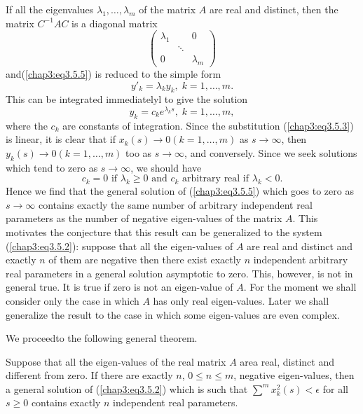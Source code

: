 If all the eigenvalues $\lambda_1, \ldots, \lambda_m$ of the matrix
$A$ are real and distinct, then the matrix $C^{-1} A C $ is a diagonal
matrix  
$$
\begin{pmatrix}
\lambda_1  & & 0\\
& \ddots & \\
0 & & \lambda_m
\end{pmatrix}
$$
and\pageoriginale (\ref{chap3:eq3.5.5}) is reduced to the simple form
\begin{equation*}
y'_k = \lambda_k y_k, \; k = 1, \ldots, m. \tag{3.5.6}\label{chap3:eq3.5.6}
\end{equation*}
This can be integrated immediatelyl to give the solution
\begin{equation*}
y_k = c_k e^{\lambda_k s}, \; k = 1, \ldots, m, \tag{3.5.7}\label{chap3:eq3.5.7}
\end{equation*}
where the $c_k$ are constants of integration. Since the substitution
(\ref{chap3:eq3.5.3}) is linear, it is clear that if $x_k (s) \to 0 (k
= 1, \ldots, m)$ as $s \to \infty$, then $y_k(s) \to 0 (k = 1, \ldots,
m)$ too as $s \to \infty$, and conversely. Since we seek solutions
which tend to zero as $s \to \infty$, we should have 
\begin{equation*}
c_k = 0 \text{ if } \lambda_k \geq 0 \text{ and } c_k \text{ arbitrary
  real if } \lambda_k < 0. \tag{3.5.8}\label{chap3:eq3.5.8} 
\end{equation*}
Hence we find that the general solution of (\ref{chap3:eq3.5.5}) which
goes to zero as $s \to \infty$ contains exactly the same number of
arbitrary independent real parameters as the number of negative
eigen-values of the matrix $A$. This motivates the conjecture that
this result can be generalized to the system (\ref{chap3:eq3.5.2}):
suppose that all the eigen-values of $A$ are real and distinct and
exactly $n$ of them are negative then there exist exactly $n$
independent arbitrary  real parameters in a general solution
asymptotic to zero. This, however, is not in general true. It is true
if zero is not an eigen-value of $A$. For the moment we shall consider
only the case in which $A$ has only real eigen-values. Later we shall
generalize the result to the case in which some eigen-values are even
complex. 

We proceed\pageoriginale to the following general theorem. 

\setcounter{subtheorem}{0}
\begin{subtheorem}\label{chap3:thm3.5.1}
Suppose that all the eigen-values of the real matrix $A$ area real,
distinct and different from zero. If there are exactly $n$, $0 \leq n
\leq m$, negative eigen-values, then a general solution of
(\ref{chap3:eq3.5.2}) which is such that $\sum\limits^m x^2_k(s) <
\epsilon$ for all $s \geq 0$ contains exactly $n$ independent real
parameters. 
\end{subtheorem}

